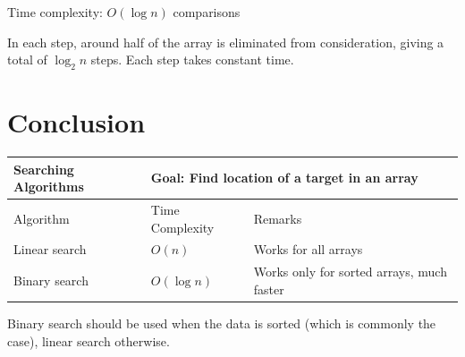 Time complexity: $O(\log n)$ comparisons
\vspace{6mm}

In each step, around half of the array is eliminated from consideration, giving a total of $\log_2 n$ steps. Each step takes constant time.

\section{Conclusion}

\begin{table}[h]
    \centering
    \begin{tabular}{|m{6em}|m{9em}|m{18em}|}
        \hline  
        \textbf{Searching Algorithms} & 
        \multicolumn{2}{l|}{Goal: Find location of a target in an array}
        \\ \hline \hline
        
        Algorithm &
        Time Complexity & 
        Remarks
        \\ \hline \hline
        
        Linear search &
        $O(n)$ &
        Works for all arrays
        \\ \hline
        
        Binary search &
        $O(\log n)$ &
        Works only for sorted arrays, much faster
        \\ \hline
    \end{tabular}
\end{table}

Binary search should be used when the data is sorted (which is commonly the case), linear search otherwise.